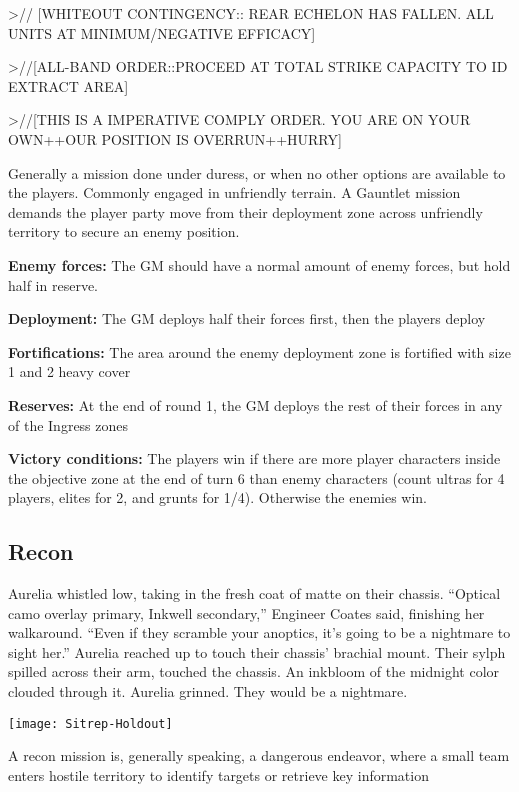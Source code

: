>// [WHITEOUT CONTINGENCY:: REAR ECHELON HAS FALLEN. ALL UNITS AT
MINIMUM/NEGATIVE EFFICACY]

>//[ALL-BAND ORDER::PROCEED AT TOTAL STRIKE CAPACITY TO ID EXTRACT AREA]

>//[THIS IS A IMPERATIVE COMPLY ORDER. YOU ARE ON YOUR OWN++OUR POSITION IS
OVERRUN++HURRY]

Generally a mission done under duress, or when no other options are available to the players. Commonly engaged in unfriendly terrain. A Gauntlet mission demands the player party move from their deployment zone across unfriendly territory to secure an enemy position.

\textbf{Enemy forces:} The GM should have a normal amount of enemy forces, but hold half in reserve.

\textbf{Deployment:} The GM deploys half their forces first, then the players deploy

\textbf{Fortifications:} The area around the enemy deployment zone is fortified with size 1 and 2 heavy cover

\textbf{Reserves:} At the end of round 1, the GM deploys the rest of their forces in any of the Ingress zones

\textbf{Victory conditions:} The players win if there are more player characters inside the objective zone at the end of turn 6 than enemy characters (count ultras for 4 players, elites for 2, and grunts for 1/4). Otherwise the enemies win. 

 \subsection{Recon}
 Aurelia whistled low, taking in the fresh coat of matte on their chassis. “Optical camo overlay primary, Inkwell secondary,” Engineer Coates said, finishing her walkaround. “Even if they scramble your anoptics, it’s going to be a nightmare to sight her.” Aurelia reached up to touch their chassis’ brachial mount. Their sylph spilled across their arm, touched the chassis. An inkbloom of the midnight color clouded through it. Aurelia grinned. They would be a nightmare.
 
 \begin{center}
   \texttt{[image: Sitrep-Holdout]}
 \end{center}

 A recon mission is, generally speaking, a dangerous endeavor, where a small team enters hostile territory to identify targets or retrieve key information

